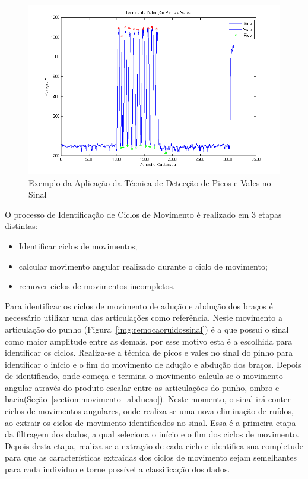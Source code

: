 \begin{figure}[!htb]
     \centering
     \includegraphics[width=1\textwidth]{./img/deteccaopicosvales.png}
     \caption{Exemplo da Aplicação da Técnica de Detecção de Picos e Vales no Sinal}
     \label{img:expicosvales}
\end{figure}


O processo de Identificação de Ciclos de Movimento é realizado em 3 etapas distintas:
\begin{itemize}
	\item Identificar ciclos de movimentos;
	\item calcular movimento angular realizado durante o ciclo de movimento;
	\item remover ciclos de movimentos incompletos.
\end{itemize}

Para identificar os ciclos de movimento de adução e abdução dos braços é necessário utilizar uma das articulações como referência. Neste movimento a articulação do punho (Figura~\ref{img:remocaoruidossinal}) é a que possui o sinal como maior amplitude entre as demais, por esse motivo esta é a escolhida para identificar os ciclos. Realiza-se a técnica de picos e vales no sinal do pinho para identificar o início e o fim do movimento de adução e abdução dos braços. Depois de identificado, onde começa e termina o movimento calcula-se o movimento angular através do produto escalar entre as articulações do punho, ombro e bacia(Seção~\ref{section:movimento_abducao}). Neste momento, o sinal irá conter ciclos de movimentos angulares, onde realiza-se uma nova eliminação de ruídos, ao extrair os ciclos de movimento identificados no sinal. Essa é a primeira etapa da filtragem dos dados, a qual seleciona o início e o fim dos ciclos de movimento. Depois desta etapa, realiza-se a extração de cada ciclo e identifica sua completude para que as características extraídas dos ciclos de movimento sejam semelhantes para cada indivíduo e torne possível a classificação dos dados.

